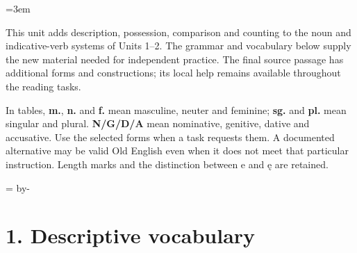 \BookRecto
\begingroup
\renewcommand{\runningtitle}{Unit 3. Adjectives and number}
\emergencystretch=3em
\newcommand{\itempara}[2]{\par\addvspace{3pt}\noindent\hangindent=1.8em\hangafter=1\makebox[1.8em][l]{#1.}#2\par}
\newcommand{\reserve}[1]{\par\penalty-100\begingroup\dimen0=\pagegoal\advance\dimen0 by-\pagetotal\ifdim\dimen0<#1\newpage\fi\endgroup}

\raggedright
{}

This unit adds description, possession, comparison and counting to the noun and indicative-verb systems of Units 1–2. The grammar and vocabulary below supply the new material needed for independent practice. The final source passage has additional forms and constructions; its local help remains available throughout the reading tasks.

In tables, \textbf{m.}, \textbf{n.} and \textbf{f.} mean masculine, neuter and feminine; \textbf{sg.} and \textbf{pl.} mean singular and plural. \textbf{N/\allowbreak{}G/\allowbreak{}D/\allowbreak{}A} mean nominative, genitive, dative and accusative. Use the selected forms when a task requests them. A documented alternative may be valid Old English even when it does not meet that particular instruction. Length marks and the distinction between e and ę are retained.

\reserve{7\baselineskip}
\section*{1. Descriptive vocabulary}

